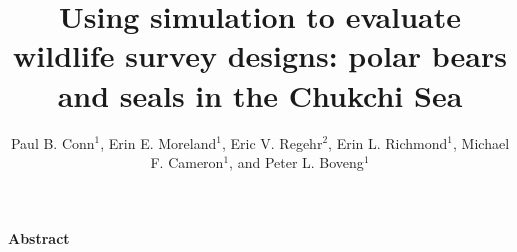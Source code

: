 \documentclass[]{rsos}%
\begin{document}
\title{Using simulation to evaluate wildlife survey designs: polar bears and seals in the Chukchi Sea}

\author{%
Paul B. Conn$^{1}$, Erin E. Moreland$^{1}$, Eric V. Regehr$^{2}$, Erin L. Richmond$^{1}$,  Michael F. Cameron$^{1}$, and Peter L. Boveng$^{1}$}

\address{$^{1}$Alaska Fisheries Science Center, National Marine Fisheries Service, NOAA, 7600 Sand Point Way NE, Seattle, WA 98115 USA\\
$^{2}$U.S. Fish and Wildlife Service, Marine Mammals Management, 1011 East Tudor Road, Anchorage, Alaska 99503 USA\\}

\subject{statistics, ecology}




\maketitle

{\bf Abstract}
\end{document}
